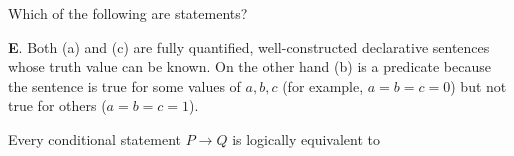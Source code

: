 \documentclass[addpoints]{exam}
\begin{document}
		
\vspace*{0pt}



\begin{questions}

	

\question[2] Which of the following are statements? 

\begin{solution}
	\textbf{E}. Both (a) and (c) are fully quantified, well-constructed declarative sentences whose truth value can be known. On the other hand (b) is a predicate because the sentence is true for some values of $a,b,c$ (for example, $a=b=c=0$) but not true for others ($a=b=c=1$). 
\end{solution}

\question[2] Every conditional statement $P \rightarrow Q$ is logically equivalent to
\end{questions}
\end{document}
